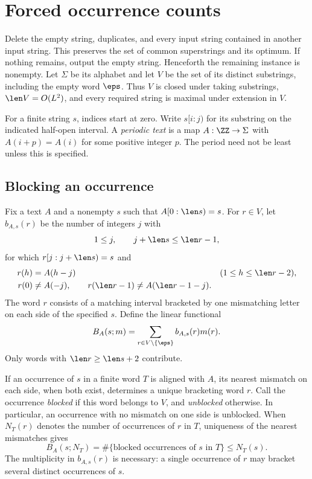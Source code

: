 \section{Forced occurrence counts}\label{sec:counts}

Delete the empty string, duplicates, and every input string contained in another input string. This preserves the set of common superstrings and its optimum. If nothing remains, output the empty string. Henceforth the remaining instance is nonempty. Let $\Sigma$ be its alphabet and let $V$ be the set of its distinct substrings, including the empty word $\eps$. Thus $V$ is closed under taking substrings, $\len V=O(L^2)$, and every required string is maximal under extension in $V$.

For a finite string $s$, indices start at zero. Write $s[i:j)$ for its substring on the indicated half-open interval. A \emph{periodic text} is a map $A:\ZZ\to\Sigma$ with $A(i+p)=A(i)$ for some positive integer $p$. The period need not be least unless this is specified.

\subsection{Blocking an occurrence}

Fix a text $A$ and a nonempty $s$ such that $A[0:\len s)=s$. For $r\in V$, let $b_{A,s}(r)$ be the number of integers $j$ with
\[
1\le j,\qquad j+\len s\le\len r-1,
\]
for which $r[j:j+\len s)=s$ and
\begin{align}
r(h)&=A(h-j) &&(1\le h\le\len r-2),\label{eq:block-interior}\\
r(0)&\ne A(-j),\qquad
r(\len r-1)\ne A(\len r-1-j).\label{eq:block-ends}
\end{align}
The word $r$ consists of a matching interval bracketed by one mismatching letter on each side of the specified $s$. Define the linear functional
\begin{equation}\label{eq:block-functional}
B_A(s;m)=\sum_{r\in V\setminus\{\eps\}}b_{A,s}(r)m(r).
\end{equation}
Only words with $\len r\ge\len s+2$ contribute.

If an occurrence of $s$ in a finite word $T$ is aligned with $A$, its nearest mismatch on each side, when both exist, determines a unique bracketing word $r$. Call the occurrence \emph{blocked} if this word belongs to $V$, and \emph{unblocked} otherwise. In particular, an occurrence with no mismatch on one side is unblocked. When $N_T(r)$ denotes the number of occurrences of $r$ in $T$, uniqueness of the nearest mismatches gives
\begin{equation}\label{eq:block-count}
B_A(s;N_T)=\#\{\text{blocked occurrences of }s\text{ in }T\}
\le N_T(s).
\end{equation}
The multiplicity in $b_{A,s}(r)$ is necessary: a single occurrence of $r$ may bracket several distinct occurrences of $s$.

